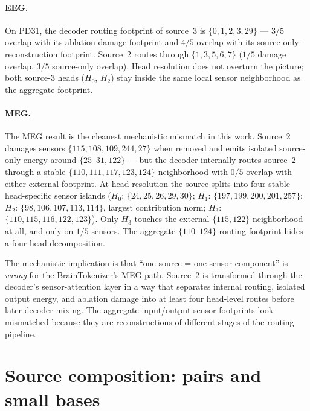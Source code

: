 \documentclass[11pt]{article}
\begin{document}
\paragraph{EEG.} On PD31, the decoder routing footprint of source~3 is
$\{0, 1, 2, 3, 29\}$ --- $3/5$ overlap with its ablation-damage footprint and
$4/5$ overlap with its source-only-reconstruction footprint. Source~2 routes
through $\{1, 3, 5, 6, 7\}$ ($1/5$ damage overlap, $3/5$ source-only overlap).
Head resolution does not overturn the picture; both source-3 heads
($H_0$, $H_2$) stay inside the same local sensor neighborhood as the aggregate
footprint.

\paragraph{MEG.} The MEG result is the cleanest mechanistic mismatch in this
work. Source~2 damages sensors $\{115, 108, 109, 244, 27\}$ when removed and
emits isolated source-only energy around $\{25\text{--}31, 122\}$ --- but the
decoder internally routes source~2 through a stable
$\{110, 111, 117, 123, 124\}$ neighborhood with $0/5$ overlap with either
external footprint. At head resolution the source splits into four stable
head-specific sensor islands ($H_0$: $\{24, 25, 26, 29, 30\}$;
$H_1$: $\{197, 199, 200, 201, 257\}$;
$H_2$: $\{98, 106, 107, 113, 114\}$, largest contribution norm;
$H_3$: $\{110, 115, 116, 122, 123\}$). Only $H_3$ touches the external
$\{115, 122\}$ neighborhood at all, and only on $1/5$ sensors. The aggregate
$\{110\text{--}124\}$ routing footprint hides a four-head decomposition.

The mechanistic implication is that ``one source = one sensor component'' is
\emph{wrong} for the BrainTokenizer's MEG path. Source~2 is transformed
through the decoder's sensor-attention layer in a way that separates internal
routing, isolated output energy, and ablation damage into at least four
head-level routes before later decoder mixing. The aggregate input/output
sensor footprints look mismatched because they are reconstructions of
different stages of the routing pipeline.

\section{Source composition: pairs and small bases}\label{sec:composition}
\end{document}
